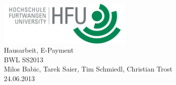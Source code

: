 \documentclass[pdftex,fontsize=11pt,a4paper]{scrbook}
\begin{document}
\begin{titlepage}
\thispagestyle{empty}
\begin{center}
\includegraphics[width=0.5\textwidth]{hfu.png}~\\[1.5cm]
\Huge Hausarbeit, E-Payment\\[0.4cm]
\Huge BWL SS2013\\[1cm]
\LARGE Milos Babic, Tarek Saier, Tim Schmiedl, Christian Trost\\[0.2cm]
\normalsize 24.06.2013
\end{center}
\end{titlepage}
\end{document}
